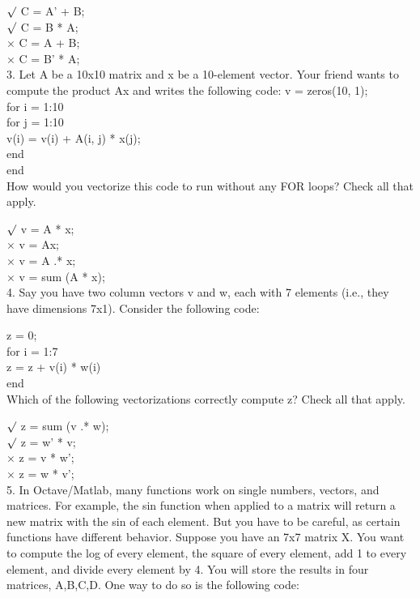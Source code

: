 \documentclass[11pt,a4paper]{article}
\begin{document}
$\surd$ C = A' + B;\\
$\surd$ C = B * A;\\
$\times$ C = A + B;\\
$\times$ C = B' * A;\\



3. Let A be a 10x10 matrix and x be a 10-element vector. Your friend wants to compute the product Ax and writes the following code:
v = zeros(10, 1);\\
for i = 1:10\\
  for j = 1:10\\
    v(i) = v(i) + A(i, j) * x(j);\\
  end\\
end\\
How would you vectorize this code to run without any FOR loops? Check all that apply.

$\surd$ v = A * x;\\

$\times$ v = Ax;\\

$\times$ v = A .* x;\\

$\times$ v = sum (A * x);\\



4. Say you have two column vectors v and w, each with 7 elements (i.e., they have dimensions 7x1). Consider the following code:

z = 0;\\
for i = 1:7\\
  z = z + v(i) * w(i)\\
end\\

Which of the following vectorizations correctly compute z? Check all that apply.

$\surd$ z = sum (v .* w);\\
$\surd$ z = w' * v;\\
$\times$ z = v * w';\\
$\times$ z = w * v';\\


5. In Octave/Matlab, many functions work on single numbers, vectors, and matrices. For example, the sin function when applied to a matrix will return a new matrix with the sin of each element. But you have to be careful, as certain functions have different behavior. Suppose you have an 7x7 matrix X. You want to compute the log of every element, the square of every element, add 1 to every element, and divide every element by 4. You will store the results in four matrices, A,B,C,D. One way to do so is the following code:
\end{document}
